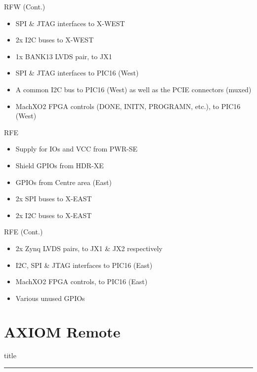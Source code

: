 \documentclass{beamer}
\begin{document}
\begin{frame}{RFW (Cont.)}
    \begin{itemize}
    \item SPI \& JTAG interfaces to X-WEST
    \item 2x I2C buses to X-WEST
    \item 1x BANK13 LVDS pair, to JX1
    \item SPI \& JTAG interfaces to PIC16 (West)
    \item A common I2C bus to PIC16 (West) as well as the PCIE connectors (muxed)
    \item MachXO2 FPGA controls (DONE, INITN, PROGRAMN, etc.), to PIC16 (West) 
    \end{itemize}
\end{frame}

\begin{frame}{RFE}
    \begin{itemize}
    \item Supply for IOs and VCC from PWR-SE
    \item Shield GPIOs from HDR-XE 
    \item GPIOs from Centre area (East)
    \item 2x SPI buses to X-EAST
    \item 2x I2C buses to X-EAST
    \end{itemize}
\end{frame}

\begin{frame}{RFE (Cont.)}
    \begin{itemize}
    \item 2x Zynq LVDS pairs, to JX1 \& JX2 respectively
    \item I2C, SPI \& JTAG interfaces to PIC16 (East)
    \item MachXO2 FPGA controls, to PIC16 (East)
    \item Various unused GPIOs
    \end{itemize}
\end{frame}


\section{AXIOM Remote}

\begin{frame}[plain]
    \begin{beamercolorbox}[sep=8pt,center,shadow=true,rounded=true]{title}
        \insertsectionhead\par
        \color{apertus_orange}\noindent\rule{10cm}{1pt}
    \end{beamercolorbox}
\end{frame}
\end{document}
